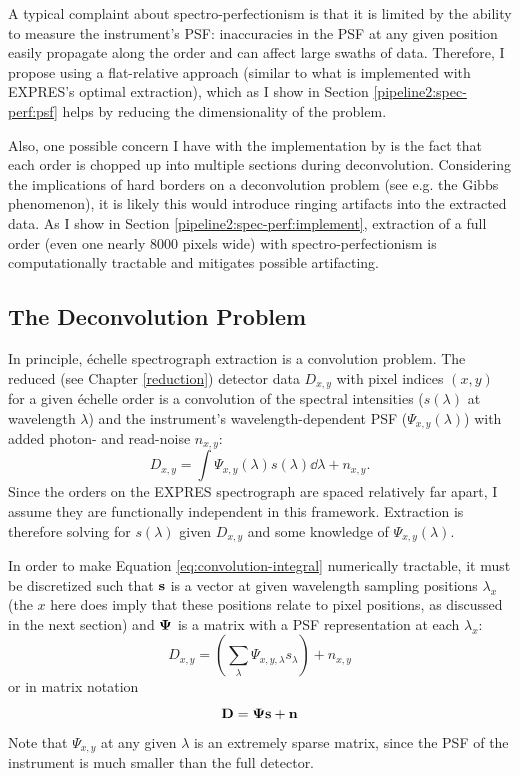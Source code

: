 A typical complaint about spectro-perfectionism is that it is limited by the ability to measure the instrument's PSF: inaccuracies in the PSF at any given position easily propagate along the order and can affect large swaths of data. Therefore, I propose using a flat-relative approach (similar to what is implemented with EXPRES's optimal extraction), which as I show in Section \ref{pipeline2:spec-perf:psf} helps by reducing the dimensionality of the problem.

Also, one possible concern I have with the implementation by \citet{cornachione_full_2019} is the fact that each order is chopped up into multiple sections during deconvolution. Considering the implications of hard borders on a deconvolution problem (see e.g. the Gibbs phenomenon), it is likely this would introduce ringing artifacts into the extracted data. As I show in Section \ref{pipeline2:spec-perf:implement}, extraction of a full order (even one nearly 8000 pixels wide) with spectro-perfectionism is computationally tractable and mitigates possible artifacting.


\subsection{The Deconvolution Problem} \label{pipeline2:spec-perf:bkgd}

In principle, \'{e}chelle spectrograph extraction is a convolution problem. The reduced (see Chapter \ref{reduction}) detector data $D_{x,y}$ with pixel indices $(x, y)$ for a given \'{e}chelle order is a convolution of the spectral intensities ($s(\lambda)$ at wavelength $\lambda$) and the instrument's wavelength-dependent PSF ($\Psi_{x,y}(\lambda)$) with added photon- and read-noise $n_{x,y}$:
\begin{equation}
    D_{x,y} = \int \Psi_{x,y}(\lambda) s(\lambda) \dd{\lambda} + n_{x,y}.
\end{equation}
\label{eq:convolution-integral}
Since the orders on the EXPRES spectrograph are spaced relatively far apart, I assume they are functionally independent in this framework. Extraction is therefore solving for $s(\lambda)$ given $D_{x,y}$ and some knowledge of $\Psi_{x,y}(\lambda)$.

In order to make Equation \ref{eq:convolution-integral} numerically tractable, it must be discretized such that $\vb{s}$ is a vector at given wavelength sampling positions {$\lambda_x$} (the $x$ here does imply that these positions relate to pixel positions, as discussed in the next section) and $\vb{\Psi}$ is a matrix with a PSF representation at each $\lambda_x$:
\begin{equation}
    D_{x,y} = \left( \sum_\lambda \Psi_{x,y,\lambda} s_\lambda \right) + n_{x,y}
    \label{eq:convolution-index}
\end{equation}
or in matrix notation
\begin{equation}
    \vb{D} = \vb{\Psi}\vb{s} + \vb{n}
    \label{eq:convolution-matrix}
\end{equation}
Note that $\Psi_{x,y}$ at any given $\lambda$ is an extremely sparse matrix, since the PSF of the instrument is much smaller than the full detector.

